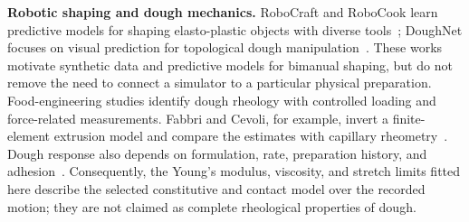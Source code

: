 \textbf{Robotic shaping and dough mechanics.}
RoboCraft and RoboCook learn predictive models for shaping elasto-plastic objects with diverse tools~\cite{shi2022robocraft,shi2023robocook}; DoughNet focuses on visual prediction for topological dough manipulation~\cite{bauer2024doughnet}. These works motivate synthetic data and predictive models for bimanual shaping, but do not remove the need to connect a simulator to a particular physical preparation. Food-engineering studies identify dough rheology with controlled loading and force-related measurements. Fabbri and Cevoli, for example, invert a finite-element extrusion model and compare the estimates with capillary rheometry~\cite{fabbri2015dough}. Dough response also depends on formulation, rate, preparation history, and adhesion~\cite{yazar2023doughreview,ghorbel2014adhesion}. Consequently, the Young's modulus, viscosity, and stretch limits fitted here describe the selected constitutive and contact model over the recorded motion; they are not claimed as complete rheological properties of dough.
